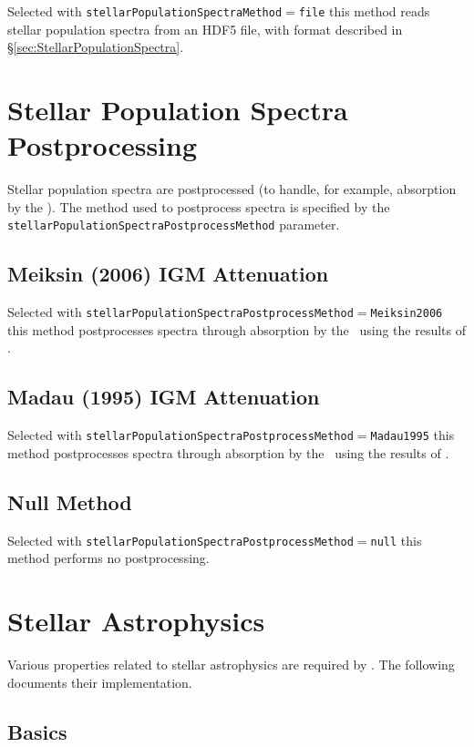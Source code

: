 Selected with {\tt stellarPopulationSpectraMethod}$=${\tt file} this method reads stellar population spectra from an HDF5 file, with format described in \S\ref{sec:StellarPopulationSpectra}.

\section{Stellar Population Spectra Postprocessing}

Stellar population spectra are postprocessed (to handle, for example, absorption by the \IGM). The method used to postprocess spectra is specified by the {\tt stellarPopulationSpectraPostprocessMethod} parameter.

\subsection{Meiksin (2006) IGM Attenuation}

Selected with {\tt stellarPopulationSpectraPostprocessMethod}$=${\tt Meiksin2006} this method postprocesses spectra through absorption by the \IGM\ using the results of \cite{meiksin_colour_2006}.

\subsection{Madau (1995) IGM Attenuation}

Selected with {\tt stellarPopulationSpectraPostprocessMethod}$=${\tt Madau1995} this method postprocesses spectra through absorption by the \IGM\ using the results of \cite{madau_radiative_1995}.

\subsection{Null Method}

Selected with {\tt stellarPopulationSpectraPostprocessMethod}$=${\tt null} this method performs no postprocessing.

\section{Stellar Astrophysics}

Various properties related to stellar astrophysics are required by \glc. The following documents their implementation.

\subsection{Basics}

